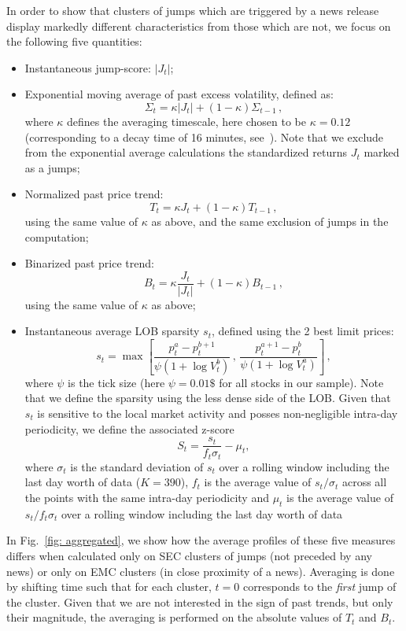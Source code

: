 \documentclass[amsmath,amssymb,aps,pre,floatfix,twocolumn,superscriptaddress]{revtex4}
\begin{document}
In order to show that clusters of jumps which are triggered by a news release display markedly different characteristics from those which are not, we focus on the following five quantities: 
\begin{itemize}
    \item Instantaneous jump-score: $\vert J_t \vert$;
    \item Exponential moving average of past excess volatility, defined as:
    \[
    \Sigma_t = \kappa \vert J_t \vert+ (1-\kappa) \Sigma_{t-1} \,,
    \]
    where $\kappa$ defines the averaging timescale, here chosen to be $\kappa=0.12$ (corresponding to a decay time of 16 minutes, see~\cite{fosset2020endogenous,quadratic_hawkes}). Note that we exclude from the exponential  average calculations the standardized returns $J_t$ marked as a jumps;
    \item Normalized past price trend:
    \[
    T_t = \kappa J_t + (1-\kappa) T_{t-1} \,,
    \]
    using the same value of $\kappa$ as above, and the same exclusion of jumps in the computation;
    \item Binarized past price trend:
    \[
    B_t = \kappa \frac{J_t}{\vert J_t \vert} + (1-\kappa) B_{t-1} \,,
    \]
    using the same value of $\kappa$ as above;
    \item Instantaneous average LOB sparsity $s_t$, defined using the 2 best limit prices:
    \[
    s_t = \max\left[ \frac{p_t^{a} - p_t^{b+1}}{\psi (1+\log V_t^b)} \, , \, \frac{p_t^{a+1} - p_t^{b}}{\psi (1+\log V_t^a)}  \right] \,,
    \]
    where $\psi$ is the tick size (here $\psi=0.01 \$$ for all stocks in our sample). Note that we define the sparsity using the less dense side of the LOB. Given that $s_t$ is sensitive to the local market activity and posses non-negligible intra-day periodicity, we define the associated z-score 
    \[ 
    S_t = \frac{s_t}{f_t \sigma_t} - \mu_t,
    \] 
    where $\sigma_t$ is the standard deviation of $s_t$ over a rolling window including the last day worth of data ($K=390$), $f_t$ is the average value of $s_t/\sigma_t$ across all the points with the same intra-day periodicity and $\mu_t$ is the average value of $s_t / f_t \sigma_t$ over a rolling window including the last day worth of data
\end{itemize}

In Fig.~\ref{fig: aggregated}, we show how the average profiles of these five measures differs when calculated only on SEC clusters of jumps (not preceded by any news) or only on EMC clusters (in close proximity of a news). Averaging is done by shifting time such that for each cluster, $t=0$ corresponds to the {\it first} jump of the cluster. Given that we are not interested in the sign of past trends, but only their magnitude, the averaging is performed on the absolute values of $T_t$ and $B_t$.
\end{document}
